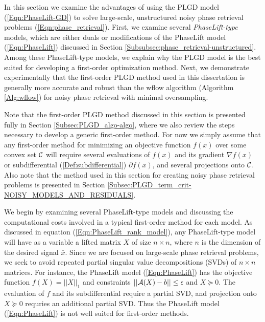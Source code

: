 In this section we examine the advantages of using the PLGD model (\ref{Eqn:PhaseLift-GD}) to solve large-scale, unstructured noisy phase retrieval problems (\ref{Eqn:phase_retrieval}). 
First, we examine several \textit{PhaseLift-type} models, which are either duals or modifications of the PhaseLift model (\ref{Eqn:PhaseLift}) discussed in Section \ref{Subsubsec:phase_retrieval-unstructured}.
Among these PhaseLift-type models, we explain why the PLGD model is the best suited for developing a first-order optimization method.
Next, we demonstrate experimentally that the first-order PLGD method used in this dissertation is generally more accurate and robust than the wflow algorithm (Algorithm \ref{Alg:wflow}) for noisy phase retrieval with minimal oversampling.

Note that the first-order PLGD method discussed in this section is presented fully in Section \ref{Subsec:PLGD_algo-algo}, where we also 
review the steps necessary to develop a generic first-order method.  
For now we simply assume that any first-order method for minimizing an objective function $f(x)$ over some convex set ${\mathcal C}$ will require several evaluations of $f(x)$ and its gradient $\nabla f(x)$ or subdifferential (\ref{Def:subdifferential}) $\partial f(x)$, and several projections onto ${\mathcal C}$.
Also note that the method used in this section for creating noisy phase retrieval problems is presented in Section \ref{Subsec:PLGD_term_crit-NOISY_MODELS_AND_RESIDUALS}.





We begin by examining several PhaseLift-type models and discussing the computational costs involved in a typical first-order method for each model.
As discussed in equation (\ref{Eqn:PhaseLift_rank_model}), any PhaseLift-type model will have as a variable a lifted matrix $X$ of size $n \times n$, where $n$ is the dimension of the desired signal $\bar{x}$.
Since we are focused on large-scale phase retrieval problems, we seek to avoid repeated partial singular value decompositions (SVDs) of $n \times n$ matrices.
For instance, the PhaseLift model (\ref{Eqn:PhaseLift}) has the objective function $f(X) = ||X||_1$ and constraints $||{\mathcal A}(X) - b|| \leq \epsilon$ and $X \succeq 0$.  
The evaluation of $f$ and its subdifferential require a partial SVD, and projection onto $X \succeq 0$ requries an additional partial SVD.
Thus the PhaseLift model (\ref{Eqn:PhaseLift}) is not well suited for first-order methods.

